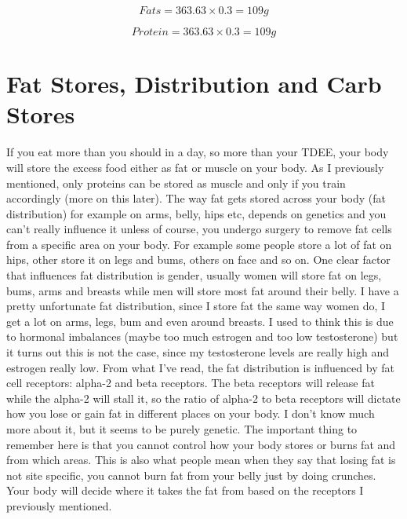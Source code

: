 \documentclass[openany, 12pt]{book}
\begin{document}
	$$ Fats = 363.63 \times 0.3 = 109g $$

	$$ Protein = 363.63 \times 0.3 = 109g $$		
	
	\section{Fat Stores, Distribution and Carb Stores}
	
	If you eat more than you should in a day, so more than your TDEE, your body will store the excess food either as fat or muscle on your body. As I previously mentioned, only
	proteins can be stored as muscle and only if you train accordingly (more on this later). The way fat gets stored across your body (fat distribution) for example on arms, belly,
	hips etc, depends on genetics and you can't really influence it unless of course, you undergo surgery to remove fat cells from a specific area on your body. For example some people
        store a lot of fat on hips, other store it on legs and bums, others on face and so on. One clear factor that influences fat distribution is gender, usually women will store fat on legs,
        bums, arms and breasts while men will store most fat around their belly. I have a pretty unfortunate fat distribution, since I store fat the same way women do, I get a lot on arms,
	legs, bum and even around breasts. I used to think this is due to hormonal imbalances (maybe too much estrogen and too low testosterone) but it turns out this is not the case,
	since my testosterone levels are really high and estrogen really low. From what I've read, the fat distribution is influenced by fat cell receptors: alpha-2 and beta receptors.
	The beta receptors will release fat while the alpha-2 will stall it, so the ratio of alpha-2 to beta receptors will dictate how you lose or gain fat in different places on your body. 
	I don't know much more about it, but it seems to be purely genetic. The important thing to remember here is that you cannot control how your body stores or burns fat and from
	which areas. This is also what people mean when they say that losing fat is not site specific, you cannot burn fat from your belly just by doing crunches. Your body will decide
	where it takes the fat from based on the receptors I previously mentioned.
	
\end{document}

